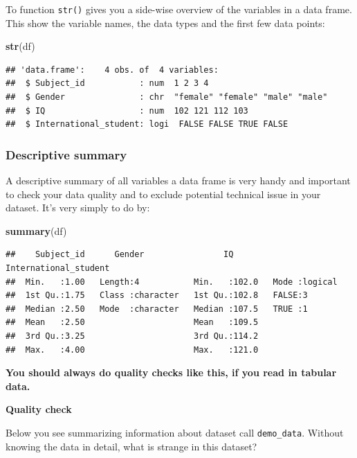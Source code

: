 \documentclass[
]{scrartcl}
\makeatletter
\newenvironment{Shaded}{\begin{snugshade}}{\end{snugshade}}
\newcommand{\FunctionTok}[1]{\textcolor[rgb]{0.13,0.29,0.53}{\textbf{#1}}}
\newcommand{\NormalTok}[1]{#1}
\newenvironment{kframe}{%
\medskip{}
\setlength{\fboxsep}{.8em}
 \def\at@end@of@kframe{}%
 \ifinner\ifhmode%
  \def\at@end@of@kframe{\end{minipage}}%
  \begin{minipage}{\columnwidth}%
 \fi\fi%
 \def\FrameCommand##1{\hskip\@totalleftmargin \hskip-\fboxsep
 \colorbox{shadecolor}{##1}\hskip-\fboxsep
     \hskip-\linewidth \hskip-\@totalleftmargin \hskip\columnwidth}%
 \MakeFramed {\advance\hsize-\width
   \@totalleftmargin\z@ \linewidth\hsize
   \@setminipage}}%
 {\par\unskip\endMakeFramed%
 \at@end@of@kframe}
\newenvironment{rmdblock}[1]
  {
  \begin{itemize}
  \renewcommand{\labelitemi}{
    \raisebox{-.7\height}[0pt][0pt]{
      {\setkeys{Gin}{width=3em,keepaspectratio}\texttt{[image: images/\#1]}}
    }
  }
  \setlength{\fboxsep}{1em}
  \begin{kframe}
  \item
  }
  {
  \end{kframe}
  \end{itemize}
  }
\newenvironment{myexercise}
    {\begin{rmdblock}{exercise_green}}
    {\end{rmdblock}}
\makeatother
\begin{document}
To function \texttt{str()} gives you a side-wise overview of the variables in a data frame. This show the variable names, the data types and the first few data points:

\begin{Shaded}
\begin{Highlighting}[]
\FunctionTok{str}\NormalTok{(df)}
\end{Highlighting}
\end{Shaded}

\begin{verbatim}
## 'data.frame':    4 obs. of  4 variables:
##  $ Subject_id           : num  1 2 3 4
##  $ Gender               : chr  "female" "female" "male" "male"
##  $ IQ                   : num  102 121 112 103
##  $ International_student: logi  FALSE FALSE TRUE FALSE
\end{verbatim}

\subsubsection*{Descriptive summary}\label{descriptive-summary}

A descriptive summary of all variables a data frame is very handy and important to check your data quality and to exclude potential technical issue in your dataset. It's very simply to do by:

\begin{Shaded}
\begin{Highlighting}[]
\FunctionTok{summary}\NormalTok{(df)}
\end{Highlighting}
\end{Shaded}

\begin{verbatim}
##    Subject_id      Gender                IQ        International_student
##  Min.   :1.00   Length:4           Min.   :102.0   Mode :logical        
##  1st Qu.:1.75   Class :character   1st Qu.:102.8   FALSE:3              
##  Median :2.50   Mode  :character   Median :107.5   TRUE :1              
##  Mean   :2.50                      Mean   :109.5                        
##  3rd Qu.:3.25                      3rd Qu.:114.2                        
##  Max.   :4.00                      Max.   :121.0
\end{verbatim}

\textbf{You should always do quality checks like this, if you read in tabular data.}

\begin{myexercise}
\textbf{Quality check}

Below you see summarizing information about dataset call
\texttt{demo\_data}. Without knowing the data in detail, what is strange
in this dataset?
\end{myexercise}
\end{document}
